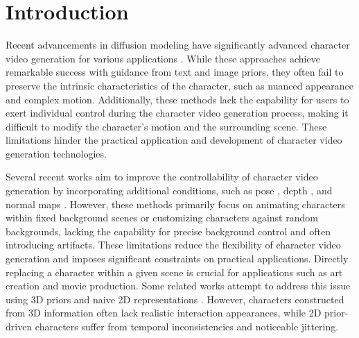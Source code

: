 \section{Introduction}


Recent advancements in diffusion modeling have significantly advanced character video generation for various applications \cite{blattmann2023stable, ho2022video, hong2022cogvideo, wu2023tune, zhang2023i2vgen, wang2024customvideo, wu2024motionbooth}. While these approaches achieve remarkable success with guidance from text and image priors, they often fail to preserve the intrinsic characteristics of the character, such as nuanced appearance and complex motion. Additionally, these methods lack the capability for users to exert individual control during the character video generation process, making it difficult to modify the character's motion and the surrounding scene. These limitations hinder the practical application and development of character video generation technologies.

Several recent works aim to improve the controllability of character video generation by incorporating additional conditions, such as pose \cite{hu2024animate, xu2024magicanimate, zhang2024mimicmotion, zhu2025champ}, depth \cite{xing2025make, zhu2025champ}, and normal maps \cite{zhu2025champ}. 
However, these methods primarily focus on animating characters within fixed background scenes or customizing characters against random backgrounds, lacking the capability for precise background control and often introducing artifacts. 
These limitations reduce the flexibility of character video generation and imposes significant constraints on practical applications. 
Directly replacing a character within a given scene is crucial for applications such as art creation and movie production. 
Some related works attempt to address this issue using 3D priors \cite{men2024mimo, viggle2024} and naive 2D representations \cite{zhao2023make, qiu2024moviecharacter}. However, characters constructed from 3D information often lack realistic interaction appearances, while 2D prior-driven characters suffer from temporal inconsistencies and noticeable jittering.






